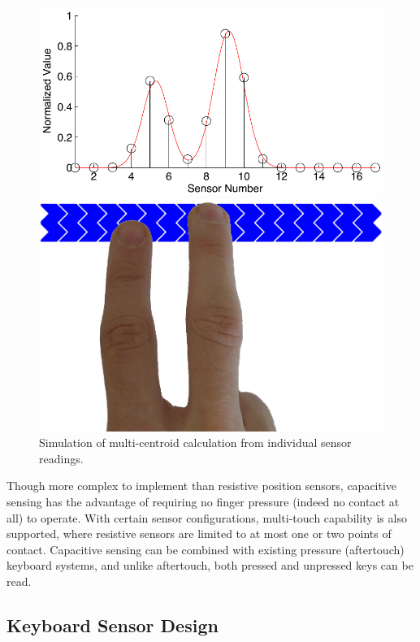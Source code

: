 \begin{figure}[t]
\centerline{\includegraphics[width=\columnwidth]{fig1a_touch_simulation.pdf}}
\centerline{\hspace{24pt}\includegraphics[width=0.8\columnwidth]{fig1b_touchkey-sharp2.png}}
\caption{Simulation of multi-centroid calculation from individual sensor readings.}
\label{McPherson:fig:slider}
\end{figure}

Though more complex to implement than resistive position sensors, capacitive sensing has the advantage of requiring no finger pressure (indeed no contact at all) to operate. With certain sensor configurations, multi-touch capability is also supported, where resistive sensors are limited to at most one or two points of contact. Capacitive sensing can be combined with existing pressure (aftertouch) keyboard systems, and unlike aftertouch, both pressed and unpressed keys can be read.

\subsection{Keyboard Sensor Design}

